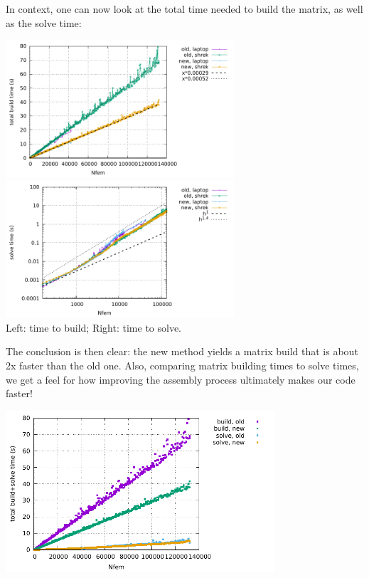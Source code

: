 In context, one can now look at the total time needed to build the matrix,
as well as the solve time:
\begin{center}
\includegraphics[width=8.5cm]{python_codes/fieldstone_176/RESULTS/build.pdf}
\includegraphics[width=8.5cm]{python_codes/fieldstone_176/RESULTS/solve.pdf}\\
{\captionfont Left: time to build; Right: time to solve.}
\end{center}
The conclusion is then clear: the new method yields a matrix build that 
is about 2x faster than the old one.
Also, comparing matrix building times to solve times, we get a feel for how 
improving the assembly process ultimately makes our code faster!
\begin{center}
\includegraphics[width=10cm]{python_codes/fieldstone_176/RESULTS/build_solve.pdf}
\end{center}

